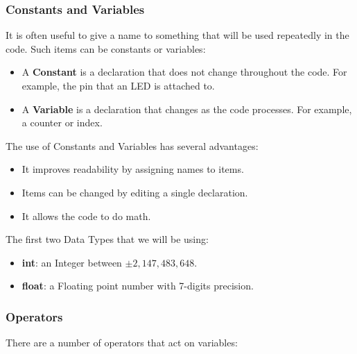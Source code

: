 \documentclass{beamer}
\begin{document}
\begin{frame}\frametitle{Constants and Variables}
It is often useful to give a name to something that will be used repeatedly in the code. Such items can be constants or variables:
\begin{itemize}
\item A \textbf{Constant} is a declaration that does not change throughout the code. For example, the pin that an LED is attached to.
\item A \textbf{Variable} is a declaration that changes as the code processes. For example, a counter or index. 
\end{itemize}
The use of Constants and Variables has several advantages:
\begin{itemize}
\item It improves readability by assigning names to items.
\item Items can be changed by editing a single declaration.
\item It allows the code to do math.
\end{itemize}
The first two Data Types that we will be using:
\begin{itemize}
\item \textbf{int}: an Integer between $\pm 2,147,483,648$.
\item \textbf{float}: a Floating point number with 7-digits precision.
\end{itemize}
\end{frame}





\begin{frame}\frametitle{Operators}
There are a number of operators that act on variables:
\lstoper
\end{frame}
\end{document}
